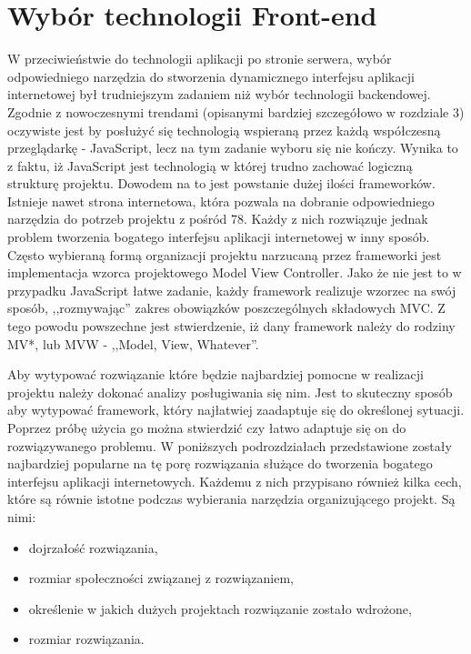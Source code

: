 \section{Wybór technologii Front-end}

W przeciwieństwie do technologii aplikacji po stronie serwera, wybór odpowiedniego narzędzia do stworzenia dynamicznego interfejsu aplikacji internetowej był trudniejszym zadaniem niż wybór technologii backendowej. Zgodnie z nowoczesnymi trendami (opisanymi bardziej szczegółowo w rozdziale 3) oczywiste jest by posłużyć się technologią wspieraną przez każdą współczesną przeglądarkę - JavaScript\cite{javascript-book}, lecz na tym zadanie wyboru się nie kończy. Wynika to z faktu, iż JavaScript jest technologią w której trudno zachować logiczną strukturę projektu. Dowodem na to jest powstanie dużej ilości frameworków. Istnieje nawet strona internetowa, która pozwala na dobranie odpowiedniego narzędzia do potrzeb projektu z pośród 78\cite{todomvc}. Każdy z nich rozwiązuje jednak problem tworzenia bogatego interfejsu aplikacji internetowej w inny sposób. Często wybieraną formą organizacji projektu narzucaną przez frameworki jest implementacja wzorca projektowego Model View Controller. Jako że nie jest to w przypadku JavaScript łatwe zadanie, każdy framework realizuje wzorzec na swój sposób, ,,rozmywając'' zakres obowiązków poszczególnych składowych MVC. Z tego powodu powszechne jest stwierdzenie, iż dany framework należy do rodziny MV*, lub MVW - ,,Model, View, Whatever''. 
	
Aby wytypować rozwiązanie które będzie najbardziej pomocne w realizacji projektu należy dokonać analizy posługiwania się nim. Jest to skuteczny sposób aby wytypować framework, który najłatwiej zaadaptuje się do określonej sytuacji. Poprzez próbę użycia go można stwierdzić czy łatwo adaptuje się on do rozwiązywanego problemu. 
W poniższych podrozdziałach przedstawione zostały najbardziej popularne na tę porę rozwiązania służące do tworzenia bogatego interfejsu aplikacji internetowych. Każdemu z nich przypisano również kilka cech, które są równie istotne podczas wybierania narzędzia organizującego projekt. Są nimi:
\begin{itemize}
\item dojrzałość rozwiązania,
\item rozmiar społeczności związanej z rozwiązaniem,
\item określenie w jakich dużych projektach rozwiązanie zostało wdrożone,
\item rozmiar rozwiązania.
\end{itemize}


